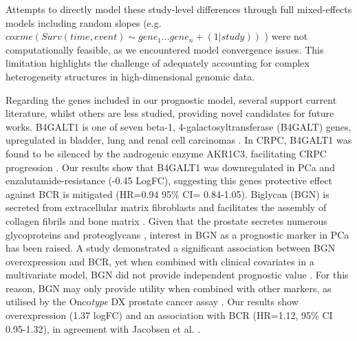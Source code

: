 \par 

Attempts to directly model these study-level differences through full mixed-effects models including random slopes (e.g. $coxme(Surv(time, event) \sim gene_1 ... gene_n + (1|study))$ ) were not computationally feasible, as we encountered model convergence issues. This limitation highlights the challenge of adequately accounting for complex heterogeneity structures in high-dimensional genomic data.


\par
Regarding the genes included in our prognostic model, several support current literature, whilst others are less studied, providing novel candidates for future works. B4GALT1 is one of seven beta-1, 4-galactosyltransferase (B4GALT) genes, upregulated in bladder, lung and renal cell carcinomas \cite{Xie2016May, Xie2018May, DeVitis2019Nov}. In CRPC, B4GALT1 was found to be silenced by the androgenic enzyme AKR1C3, facilitating CRPC progression \cite{Wang2020Sep}. Our results show that B4GALT1 was downregulated in PCa and enzalutamide-resistance (-0.45 LogFC), suggesting this genes protective effect against BCR is mitigated (HR=0.94 95\% CI= 0.84-1.05). Biglycan (BGN) is secreted from extracellular matrix fibroblasts and facilitates the assembly of collagen fibrils and bone matrix \cite{Xing2015Mar}. Given that the prostate secretes numerous glycoproteins and proteoglycans \cite{Munkley2016Jun}, interest in BGN as a prognostic marker in PCa has been raised. A study demonstrated a significant association between BGN overexpression and BCR, yet when combined with clinical covariates in a multivariate model, BGN did not provide independent prognostic value \cite{Jacobsen2017Aug}. For this reason, BGN may only provide utility when combined with other markers, as utilised by the Onco\textit{type} DX prostate cancer assay \cite{Knezevic2013Oct}. Our results show overexpression (1.37 logFC) and an association with BCR (HR=1.12, 95\% CI 0.95-1.32), in agreement with Jacobsen et al. \cite{Jacobsen2017Aug}.

\par

